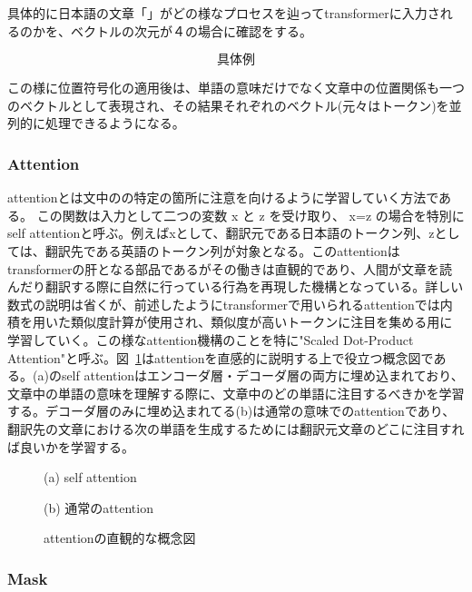 具体的に日本語の文章「」がどの様なプロセスを辿ってtransformerに入力されるのかを、ベクトルの次元が４の場合に確認をする。


\begin{equation*}
  \text{具体例}
\end{equation*}

この様に位置符号化の適用後は、単語の意味だけでなく文章中の位置関係も一つのベクトルとして表現され、その結果それぞれのベクトル(元々はトークン)を並列的に処理できるようになる。


\subsubsection{Attention}
attentionとは文中のの特定の箇所に注意を向けるように学習していく方法である。 この関数は入力として二つの変数 x と z を受け取り、 x=z の場合を特別にself attentionと呼ぶ。例えばxとして、翻訳元である日本語のトークン列、zとしては、翻訳先である英語のトークン列が対象となる。このattentionはtransformerの肝となる部品であるがその働きは直観的であり、人間が文章を読んだり翻訳する際に自然に行っている行為を再現した機構となっている。詳しい数式の説明は省くが、前述したようにtransformerで用いられるattentionでは内積を用いた類似度計算が使用され、類似度が高いトークンに注目を集める用に学習していく。この様なattention機構のことを特に"Scaled Dot-Product Attention"と呼ぶ。図~\ref{fig:att-abs}はattentionを直感的に説明する上で役立つ概念図である。(a)のself attentionはエンコーダ層・デコーダ層の両方に埋め込まれており、文章中の単語の意味を理解する際に、文章中のどの単語に注目するべきかを学習する。デコーダ層のみに埋め込まれてる(b)は通常の意味でのattentionであり、翻訳先の文章における次の単語を生成するためには翻訳元文章のどこに注目すれば良いかを学習する。


\begin{figure}
  \centering

    (a) self attention
    \vspace{5mm}

    (b) 通常のattention

  \caption{attentionの直観的な概念図}
\label{fig:att-abs}
\end{figure}



\subsubsection{Mask}

